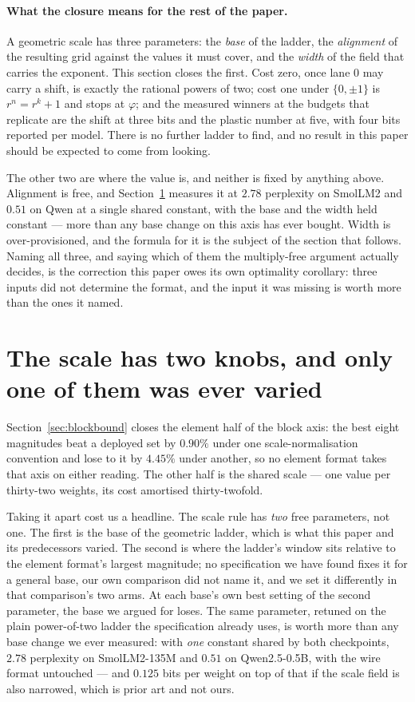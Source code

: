 \documentclass[11pt]{article}
\theoremstyle{definition}
\begin{document}
\paragraph{What the closure means for the rest of the paper.} A geometric scale
has three parameters: the \emph{base} of the ladder, the \emph{alignment} of the
resulting grid against the values it must cover, and the \emph{width} of the
field that carries the exponent. This section closes the first. Cost zero, once
lane $0$ may carry a shift, is exactly the rational powers of two; cost one
under $\{0,\pm1\}$ is $r^{n}=r^{k}+1$ and stops at $\varphi$; and the measured
winners at the budgets that replicate are the shift at three bits and the
plastic number at five, with four bits reported per model. There is no further
ladder to find, and no result in this paper should be expected to come from
looking.

The other two are where the value is, and neither is fixed by anything above.
Alignment is free, and Section~\ref{sec:alignment} measures it at $2.78$
perplexity on SmolLM2 and $0.51$ on Qwen at a single shared constant, with the
base and the width held constant --- more than any base change on this axis has
ever bought. Width is over-provisioned, and the
formula for it is the subject of the section that follows. Naming all three, and
saying which of them the multiply-free argument actually decides, is the
correction this paper owes its own optimality corollary: three inputs did not
determine the format, and the input it was missing is worth more than the ones
it named.
\section{The scale has two knobs, and only one of them was ever varied}
\label{sec:alignment}

Section~\ref{sec:blockbound} closes the element half of the block axis: the best
eight magnitudes beat a deployed set by $0.90\%$ under one scale-normalisation
convention and lose to it by $4.45\%$ under another, so no element format takes
that axis on either reading. The other half is the shared scale --- one value
per thirty-two weights, its cost amortised thirty-twofold.

Taking it apart cost us a headline. The scale rule has \emph{two} free
parameters, not one. The first is the base of the geometric ladder, which is
what this paper and its predecessors varied. The second is where the ladder's
window sits relative to the element format's largest magnitude; no
specification we have found fixes it for a general base, our own comparison did
not name it, and we set it differently in that comparison's two arms. At each
base's own best setting of the second parameter, the base we argued for loses.
The same parameter, retuned on the plain power-of-two ladder the specification
already uses, is worth more than any base change we ever measured: with
\emph{one} constant shared by both checkpoints, $2.78$ perplexity on
SmolLM2-135M and $0.51$ on Qwen2.5-0.5B, with the wire format untouched --- and
$0.125$ bits per weight on top of that if the scale field is also narrowed, which
is prior art and not ours.
\end{document}
